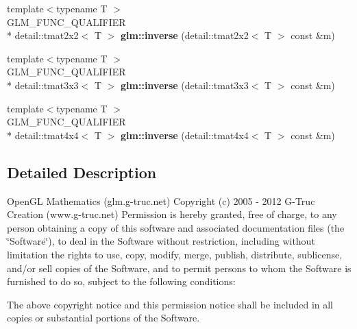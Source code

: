 \begin{DoxyCompactItemize}
\item 
\hypertarget{namespaceglm_a0bdb22ae9f1447b6bfd92c704b638973}{{\footnotesize template$<$typename T $>$ }\\G\-L\-M\-\_\-\-F\-U\-N\-C\-\_\-\-Q\-U\-A\-L\-I\-F\-I\-E\-R \\*
detail\-::tmat2x2$<$ T $>$ {\bfseries glm\-::inverse} (detail\-::tmat2x2$<$ T $>$ const \&m)}\label{namespaceglm_a0bdb22ae9f1447b6bfd92c704b638973}

\item 
\hypertarget{namespaceglm_aa36ca53440c855c7ff7671ab45768974}{{\footnotesize template$<$typename T $>$ }\\G\-L\-M\-\_\-\-F\-U\-N\-C\-\_\-\-Q\-U\-A\-L\-I\-F\-I\-E\-R \\*
detail\-::tmat3x3$<$ T $>$ {\bfseries glm\-::inverse} (detail\-::tmat3x3$<$ T $>$ const \&m)}\label{namespaceglm_aa36ca53440c855c7ff7671ab45768974}

\item 
\hypertarget{namespaceglm_ac56acd990d10a871d52d3cf08b2e145f}{{\footnotesize template$<$typename T $>$ }\\G\-L\-M\-\_\-\-F\-U\-N\-C\-\_\-\-Q\-U\-A\-L\-I\-F\-I\-E\-R \\*
detail\-::tmat4x4$<$ T $>$ {\bfseries glm\-::inverse} (detail\-::tmat4x4$<$ T $>$ const \&m)}\label{namespaceglm_ac56acd990d10a871d52d3cf08b2e145f}

\end{DoxyCompactItemize}


\subsection{Detailed Description}
Open\-G\-L Mathematics (glm.\-g-\/truc.\-net) Copyright (c) 2005 -\/ 2012 G-\/\-Truc Creation (www.\-g-\/truc.\-net) Permission is hereby granted, free of charge, to any person obtaining a copy of this software and associated documentation files (the \char`\"{}\-Software\char`\"{}), to deal in the Software without restriction, including without limitation the rights to use, copy, modify, merge, publish, distribute, sublicense, and/or sell copies of the Software, and to permit persons to whom the Software is furnished to do so, subject to the following conditions\-:

The above copyright notice and this permission notice shall be included in all copies or substantial portions of the Software.

